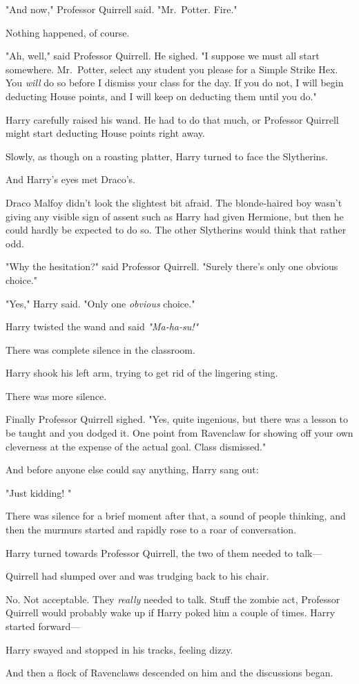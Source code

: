 "And now," Professor Quirrell said. "Mr.~Potter. Fire."

Nothing happened, of course.

"Ah, well," said Professor Quirrell. He sighed. "I suppose we must all start
somewhere. Mr.~Potter, select any student you please for a Simple Strike Hex.
You \emph{will} do so before I dismiss your class for the day. If you do not, I
will begin deducting House points, and I will keep on deducting them until you
do."

Harry carefully raised his wand. He had to do that much, or Professor Quirrell
might start deducting House points right away.

Slowly, as though on a roasting platter, Harry turned to face the Slytherins.

And Harry's eyes met Draco's.

Draco Malfoy didn't look the slightest bit afraid. The blonde-haired boy wasn't
giving any visible sign of assent such as Harry had given Hermione, but then he
could hardly be expected to do so. The other Slytherins would think that rather
odd.

"Why the hesitation?" said Professor Quirrell. "Surely there's only one obvious
choice."

"Yes," Harry said. "Only one \emph{obvious} choice."

Harry twisted the wand and said \emph{"Ma-ha-su!"}

There was complete silence in the classroom.

Harry shook his left arm, trying to get rid of the lingering sting.

There was more silence.

Finally Professor Quirrell sighed. "Yes, quite ingenious, but there was a
lesson to be taught and you dodged it. One point from Ravenclaw for showing off
your own cleverness at the expense of the actual goal. Class dismissed."

And before anyone else could say anything, Harry sang out:

"Just kidding! "

There was silence for a brief moment after that, a sound of people thinking,
and then the murmurs started and rapidly rose to a roar of conversation.

Harry turned towards Professor Quirrell, the two of them needed to talk\mbox{---}

Quirrell had slumped over and was trudging back to his chair.

No. Not acceptable. They \emph{really} needed to talk. Stuff the zombie act,
Professor Quirrell would probably wake up if Harry poked him a couple of times.
Harry started forward\mbox{---}

\emph{}

\emph{}

\emph{}

Harry swayed and stopped in his tracks, feeling dizzy.

And then a flock of Ravenclaws descended on him and the discussions began.
